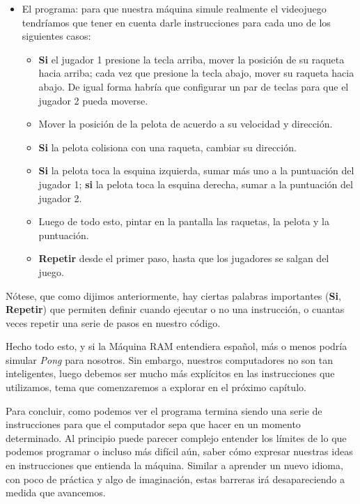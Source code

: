\begin{itemize}
	\item El programa: para que nuestra máquina simule realmente el videojuego tendríamos que tener en cuenta darle instrucciones para cada uno de los siguientes casos: 
	
	\begin{itemize}
		\item \textbf{Si} el jugador 1 presione la tecla arriba, mover la posición de su raqueta hacia arriba; cada vez que presione la tecla abajo, mover su raqueta hacia abajo. De igual forma habría que configurar un par de teclas para que el jugador 2 pueda moverse.
		
		\item Mover la posición de la pelota de acuerdo a su velocidad y dirección.
		
		\item \textbf{Si} la pelota colisiona con una raqueta, cambiar su dirección.
		
		\item \textbf{Si} la pelota toca la esquina izquierda, sumar más uno a la puntuación del jugador 1; \textbf{si} la pelota toca la esquina derecha, sumar a la puntuación del jugador 2.
		
		\item Luego de todo esto, pintar en la pantalla las raquetas, la pelota y la puntuación.
		
		\item \textbf{Repetir} desde el primer paso, hasta que los jugadores se salgan del juego.
	\end{itemize}
\end{itemize}

Nótese, que como dijimos anteriormente, hay ciertas palabras importantes (\textbf{Si}, \textbf{Repetir}) que  permiten definir cuando ejecutar o no una instrucción, o cuantas veces repetir una serie de pasos en nuestro código.

Hecho todo esto, y si la Máquina RAM entendiera español, más o menos podría simular \emph{Pong} para nosotros. Sin embargo, nuestros computadores no son tan inteligentes, luego debemos ser mucho más explícitos en las instrucciones que utilizamos, tema que comenzaremos a explorar en el próximo capítulo.

Para concluir, como podemos ver el programa termina siendo una serie de instrucciones para que el computador sepa que hacer en un momento determinado. Al principio puede parecer complejo entender los límites de lo que podemos programar o incluso más difícil aún, saber cómo expresar nuestras ideas en instrucciones que entienda la máquina. Similar a aprender un nuevo idioma, con poco de práctica y algo de imaginación, estas barreras irá desapareciendo a medida que avancemos.

